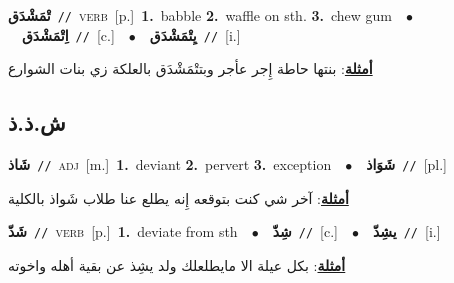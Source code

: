 \documentclass[10pt,a4paper,twoside]{article} %
\begin{document}
\begin{multicols}{2}
{\setlength\topsep{0pt}\textbf{\foreignlanguage{arabic}{تْمَشْدَق}}\ {\color{gray}\texttt{//}\color{black}}\ \textsc{verb}\ [p.]\ \textbf{1.}~babble  \textbf{2.}~waffle on sth.  \textbf{3.}~chew gum\ \ $\bullet$\ \ \setlength\topsep{0pt}\textbf{\foreignlanguage{arabic}{اِتْمَشْدَق}}\ {\color{gray}\texttt{//}\color{black}}\ [c.]\ \ $\bullet$\ \ \setlength\topsep{0pt}\textbf{\foreignlanguage{arabic}{يِتْمَشْدَق}}\ {\color{gray}\texttt{//}\color{black}}\ [i.]\  \begin{flushright}\color{gray}\foreignlanguage{arabic}{\textbf{\underline{\foreignlanguage{arabic}{أمثلة}}}: بنتها حاطة إِجر عأجر وبتتْمَشْدَق بالعلكة زي بنات الشوارع}\end{flushright}\color{black}} \vspace{2mm}

\vspace{-3mm}
\subsection*{\color{blue}\foreignlanguage{arabic}{ش.ذ.ذ}\color{blue}{}} 

{\setlength\topsep{0pt}\textbf{\foreignlanguage{arabic}{شَاذ}}\ {\color{gray}\texttt{//}\color{black}}\ \textsc{adj}\ [m.]\ \textbf{1.}~deviant  \textbf{2.}~pervert  \textbf{3.}~exception\ \ $\bullet$\ \ \setlength\topsep{0pt}\textbf{\foreignlanguage{arabic}{شَوَاذ}}\ {\color{gray}\texttt{//}\color{black}}\ [pl.]\  \begin{flushright}\color{gray}\foreignlanguage{arabic}{\textbf{\underline{\foreignlanguage{arabic}{أمثلة}}}: آخر شي كنت بتوقعه إِنه يطلع عنا طلاب شَواذ بالكلية}\end{flushright}\color{black}} \vspace{2mm}

{\setlength\topsep{0pt}\textbf{\foreignlanguage{arabic}{شَذّ}}\ {\color{gray}\texttt{//}\color{black}}\ \textsc{verb}\ [p.]\ \textbf{1.}~deviate from sth\ \ $\bullet$\ \ \setlength\topsep{0pt}\textbf{\foreignlanguage{arabic}{شِذّ}}\ {\color{gray}\texttt{//}\color{black}}\ [c.]\ \ $\bullet$\ \ \setlength\topsep{0pt}\textbf{\foreignlanguage{arabic}{يشِذّ}}\ {\color{gray}\texttt{//}\color{black}}\ [i.]\  \begin{flushright}\color{gray}\foreignlanguage{arabic}{\textbf{\underline{\foreignlanguage{arabic}{أمثلة}}}: بكل عيلة الا مايطلعلك ولد يشِذ عن بقية أهله واخوته}\end{flushright}\color{black}} \vspace{2mm}


\end{multicols}
\end{document}
